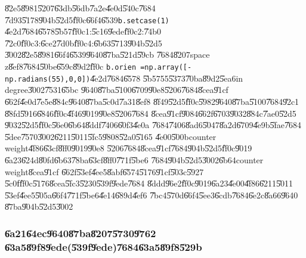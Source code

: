 \U{82e5}\U{8981}\U{5207}\U{63db}\U{56db}\U{7a2e}\U{4e0d}\U{540c}\U{7684}%
\U{7d93}\U{5178}\U{904b}\U{52d5}\U{ff0c}\U{66f4}\U{6539}\texttt{b.setcase(1)}%
\U{4e2d}\U{7684}\U{6578}\U{5b57}\U{ff0c}1:\U{5c16}\U{9ede}\U{ff0c}2:\U{74b0}%
\U{72c0}\U{ff0c}3:\U{6ce2}\U{7d0b}\U{ff0c}4:\U{6b63}\U{5713}\U{904b}\U{52d5}%
\U{3002}\U{82e5}\U{8981}\U{66f4}\U{6539}\U{9640}\U{87ba}\U{521d}\U{59cb}%
\U{7684}\U{8207}space z\U{8ef8}\U{7684}\U{50be}\U{659c}\U{89d2}\U{ff0c}%
\newline
\texttt{b.orien =np.array([-np.radians(55),0,0])}\U{4e2d}\U{7684}\U{6578}%
\U{5b57}55\U{5373}\U{70ba}\U{89d2}\U{5ea6}in degree\U{3002}\U{7531}\U{65bc}%
\U{9640}\U{87ba}\U{5100}\U{6709}\U{90e8}\U{5206}\U{7684}\U{8cea}\U{91cf}%
\U{662f}\U{4e0d}\U{7e5e}\U{884c}\U{9640}\U{87ba}\U{5c0d}\U{7a31}\U{8ef8}%
\U{8f49}\U{52d5}\U{ff0c}\U{5982}\U{9640}\U{87ba}\U{5100}\U{7684}\U{92c1}%
\U{88fd}\U{5916}\U{6846}\U{ff0c}\U{4f46}\U{9019}\U{90e8}\U{5206}\U{7684}%
\U{8cea}\U{91cf}\U{9084}\U{662f}\U{6703}\U{9032}\U{884c}\U{7ae0}\U{52d5}%
\U{9032}\U{52d5}\U{ff0c}\U{56e0}\U{6b64}\U{8ddf}\U{7406}\U{60f3}\U{4e0a}%
\U{7684}\U{7406}\U{8ad6}\U{5047}\U{8a2d}\U{6709}\U{4e9b}\U{5fae}\U{7684}%
\U{5dee}\U{7570}\U{3002}\U{6211}\U{5011}\U{5fc5}\U{9808}\U{52a0}\U{5165}%
\U{4e00}\U{500b}counter weight\U{4f86}\U{63cf}\U{8ff0}\U{9019}\U{90e8}%
\U{5206}\U{7684}\U{8cea}\U{91cf}\U{7684}\U{904b}\U{52d5}\U{ff0c}\U{9019}%
\U{6a23}\U{624d}\U{80fd}\U{6b63}\U{78ba}\U{63cf}\U{8ff0}\U{771f}\U{5be6}%
\U{7684}\U{904b}\U{52d5}\U{3002}\U{6b64}counter weight\U{8cea}\U{91cf}%
\U{662f}\U{53ef}\U{4ee5}\U{8abf}\U{6574}\U{5176}\U{91cf}\U{503c}\U{5927}%
\U{5c0f}\U{ff0c}\U{5176}\U{8cea}\U{5fc3}\U{5230}\U{539f}\U{9ede}\U{7684}%
\U{8ddd}\U{96e2}\U{ff0c}\U{9019}\U{6a23}\U{4e00}\U{4f86}\U{6211}\U{5011}%
\U{53ef}\U{4ee5}\U{505a}\U{66f4}\U{771f}\U{5be6}\U{4e14}\U{689d}\U{4ef6}%
\U{7bc4}\U{570d}\U{66f4}\U{5ee3}\U{6cdb}\U{7684}\U{6e2c}\U{8a66}\U{9640}%
\U{87ba}\U{904b}\U{52d5}\U{3002}

\clearpage%

\subsubsection{\U{6a21}\U{64ec}\U{9640}\U{87ba}\U{8207}\U{5730}\U{9762}%
\U{63a5}\U{89f8}\U{9ede}(\U{539f}\U{9ede})\U{7684}\U{63a5}\U{89f8}\U{529b}}

